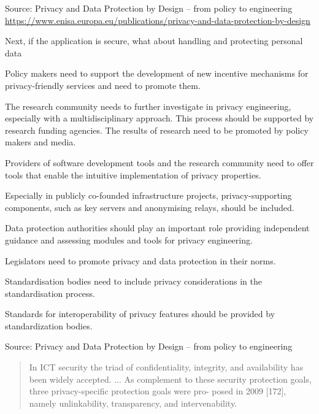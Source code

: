 \documentclass[Screen16to9,17pt]{foils}
\begin{document}
Source: Privacy and Data Protection by Design -- from policy to engineering\\
{\footnotesize\url{https://www.enisa.europa.eu/publications/privacy-and-data-protection-by-design}}

\begin{list2}
\item Next, if the application is secure, what about handling and protecting personal data
\end{list2}


\begin{list2}
\item {\small Policy makers need to support the development of new incentive mechanisms for privacy-friendly services and need to promote them.}
\item {\small The research community needs to further investigate in privacy engineering, especially with a
multidisciplinary approach. This process should be supported by research funding agencies.
The results of research need to be promoted by policy makers and media.}
\item {\small Providers of software development tools and the research community need to offer tools that
enable the intuitive implementation of privacy properties.}
\item {\small Especially in publicly co-founded infrastructure projects, privacy-supporting components,
such as key servers and anonymising relays, should be included.}
\item {\small Data protection authorities should play an important role providing independent guidance
and assessing modules and tools for privacy engineering.}
\item {\small Legislators need to promote privacy and data protection in their norms.}
\item {\small Standardisation bodies need to include privacy considerations in the standardisation process.}
\item {\small Standards for interoperability of privacy features should be provided by standardization bodies.}
\end{list2}

Source: Privacy and Data Protection by Design -- from policy to engineering\


\begin{quote}\footnotesize
In ICT
security the triad of confidentiality, integrity, and availability has been widely accepted. ...
As complement to these security protection goals, three privacy-specific protection goals were pro-
posed in 2009 [172], namely unlinkability, transparency, and intervenability.
\end{quote}
\end{document}
